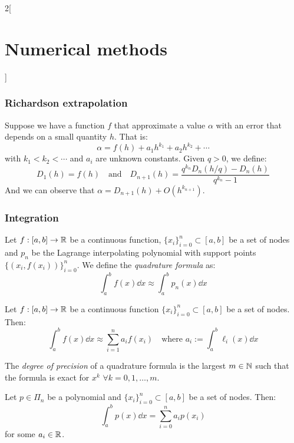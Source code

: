 \documentclass[../../../main.tex]{subfiles}
\begin{document}
\begin{multicols}{2}[\section{Numerical methods}]
    \subsubsection*{Richardson extrapolation}
    \begin{theorem}
        Suppose we have a function $f$ that approximate a value $\alpha$ with an error that depends on a small quantity $h$. That is: $$\alpha=f(h)+a_1h^{k_1}+a_2h^{k_2}+\cdots$$ with $k_1<k_2<\cdots$ and $a_i$ are unknown constants. Given $q>0$, we define: $$D_1(h)=f(h)\quad\text{and}\quad D_{n+1}(h)=\frac{q^{k_n}D_n\left(h/q\right)-D_n(h)}{q^{k_n}-1}$$ And we can observe that $\alpha=D_{n+1}(h)+O(h^{k_{n+1}})$.
    \end{theorem}
    \subsubsection*{Integration}
    \begin{definition}
        Let $f:[a,b]\rightarrow\mathbb{R}$ be a continuous function, $\{x_i\}_{i=0}^n\subset[a,b]$ be a set of nodes and $p_n$ be the Lagrange interpolating polynomial with support points $\{(x_i,f(x_i))\}_{i=0}^n$. We define the \textit{quadrature formula} as: $$\int_a^bf(x)\dd x\approx\int_a^bp_n(x)\dd x$$
    \end{definition}
    \begin{lemma}
        Let $f:[a,b]\rightarrow\mathbb{R}$ be a continuous function $\{x_i\}_{i=0}^n\subset[a,b]$ be a set of nodes. Then: $$\int_a^bf(x)\dd x\approx\sum_{i=1}^na_if(x_i)\quad\text{where }a_i:=\int_a^b\ell_i(x)\dd x$$
    \end{lemma}
    \begin{definition}
        The \textit{degree of precision} of a quadrature formula is the largest $m\in\mathbb{N}$ such that the formula is exact for $x^k$ $\forall k=0,1,\ldots,m$.
    \end{definition}
    \begin{lemma}
        Let $p\in\Pi_n$ be a polynomial and $\{x_i\}_{i=0}^n\subset[a,b]$ be a set of nodes. Then: $$\int_a^bp(x)\dd x=\sum_{i=0}^na_ip(x_i)$$ for some $a_i\in\mathbb{R}$.
    \end{lemma}

\end{multicols}
\end{document}
